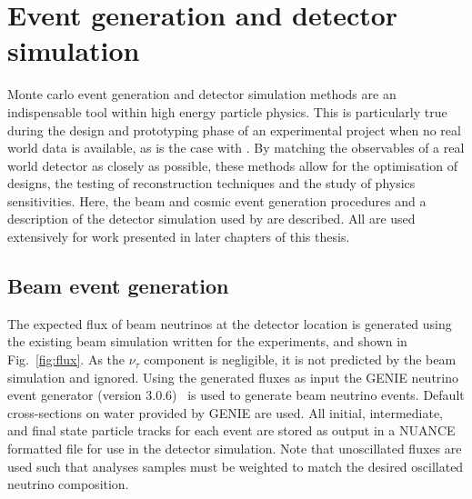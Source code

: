 \section{Event generation and detector simulation} %
\label{sec:chips_monte_carlo} %

Monte carlo event generation and detector simulation methods are an indispensable tool within high
energy particle physics. This is particularly true during the design and prototyping phase of an
experimental project when no real world data is available, as is the case with \chips. By matching
the observables of a real world detector as closely as possible, these methods allow for the
optimisation of designs, the testing of reconstruction techniques and the study of physics
sensitivities. Here, the beam and cosmic event generation procedures and a description of the
detector simulation used by \chips are described. All are used extensively for work presented in
later chapters of this thesis.

\subsection{Beam event generation} %
\label{sec:chips_monte_carlo_beam} %

The expected flux of beam neutrinos at the \chipsfive detector location is generated using the
existing beam simulation written for the \numi experiments, and shown in Fig.~\ref{fig:flux}. As
the $\nu_{\tau}$ component is negligible, it is not predicted by the beam simulation and ignored.
Using the generated fluxes as input the GENIE neutrino event generator (version
3.0.6)~\cite{andreopoulos2009, andreopoulos2015} is used to generate beam neutrino events. Default
cross-sections on water provided by GENIE are used. All initial, intermediate, and final state
particle tracks for each event are stored as output in a NUANCE formatted file for use in the
detector simulation. Note that unoscillated fluxes are used such that analyses samples must be
weighted to match the desired oscillated neutrino composition.

